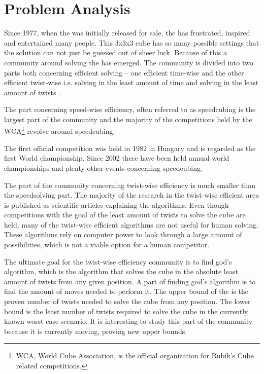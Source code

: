 \chapter{Problem Analysis}
Since 1977, when the \rubik{} was initially released for sale, the \rubik{} has frustrated, inspired and entertained many people. This 3x3x3 cube has so many possible settings that the solution can not just be guessed out of sheer luck. Because of this a community around solving the \rubik{} has emerged. The community is divided into two parts both concerning efficient solving -- one efficient time-wise and the other efficient twist-wise i.e. solving in the least amount of time and solving in the least amount of twists \cite{speedsolving.forum}. 

The part concerning speed-wise efficiency, often referred to as speedcubing is the largest part of the community and the majority of the competitions held by the WCA\footnote{WCA, World Cube Association, is the official organization for Rubik's Cube related competitions.} \cite{wca} revolve around speedcubing.

The first official competition was held in 1982 in Hungary and is regarded as the first World championship. Since 2002 there have been held annual world championships and plenty other events concerning speedcubing. 

The part of the community concerning twist-wise efficiency is much smaller than the speedsolving part. The majority of the research in the twist-wise efficient area is published as scientific articles explaining the algorithms. Even though competitions with the goal of the least amount of twists to solve the cube are held, many of the twist-wise efficient algorithms are not useful for human solving. These algorithms rely on computer power to look through a large amount of possibilities, which is not a viable option for a human competitor.


The ultimate goal for the twist-wise efficiency community is to find god's algorithm, which is the algorithm that solves the cube in the absolute least amount of twists from any given position. A part of finding god's algorithm is to find the amount of moves needed to perform it. 
The upper bound of the \rubik{} is the proven number of twists needed to solve the cube from any position. The lower bound is the least number of twists required to solve the cube in the currently known worst case scenario. 
It is interesting to study this part of the \rubik{} community because it is currently moving, proving new upper bounds.

